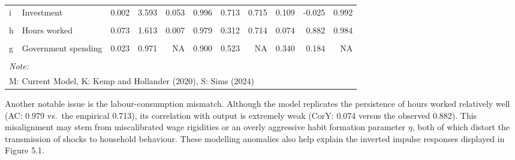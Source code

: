 \documentclass[11pt,preprint]{elsarticle}
\let\origtable\table
\let\endorigtable\endtable
\renewenvironment{table}[1][2] {
    \expandafter\origtable\expandafter[H]
} {
    \endorigtable
}
\numberwithin{equation}{section}
\numberwithin{figure}{section}
\numberwithin{table}{section}
\begin{document}
\begin{table}[!h]
{\begin{tabular}[t]{llrrrrrrrrr}
\addlinespace
i & Investment & 0.002 & 3.593 & 0.053 & 0.996 & 0.713 & 0.715 & 0.109 & -0.025 & 0.992\\
\cellcolor{gray!10}{w} & \cellcolor{gray!10}{Real wage} & \cellcolor{gray!10}{0.147} & \cellcolor{gray!10}{1.802} & \cellcolor{gray!10}{0.010} & \cellcolor{gray!10}{0.979} & \cellcolor{gray!10}{0.186} & \cellcolor{gray!10}{0.739} & \cellcolor{gray!10}{0.076} & \cellcolor{gray!10}{0.128} & \cellcolor{gray!10}{0.992}\\
h & Hours worked & 0.073 & 1.613 & 0.007 & 0.979 & 0.312 & 0.714 & 0.074 & 0.882 & 0.984\\
\cellcolor{gray!10}{K} & \cellcolor{gray!10}{Capital} & \cellcolor{gray!10}{0.002} & \cellcolor{gray!10}{NA} & \cellcolor{gray!10}{NA} & \cellcolor{gray!10}{1.000} & \cellcolor{gray!10}{NA} & \cellcolor{gray!10}{NA} & \cellcolor{gray!10}{0.068} & \cellcolor{gray!10}{NA} & \cellcolor{gray!10}{NA}\\
g & Government spending & 0.023 & 0.971 & NA & 0.900 & 0.523 & NA & 0.340 & 0.184 & NA\\
\addlinespace
\cellcolor{gray!10}{tau} & \cellcolor{gray!10}{Taxes} & \cellcolor{gray!10}{0.023} & \cellcolor{gray!10}{NA} & \cellcolor{gray!10}{NA} & \cellcolor{gray!10}{0.900} & \cellcolor{gray!10}{NA} & \cellcolor{gray!10}{NA} & \cellcolor{gray!10}{0.000} & \cellcolor{gray!10}{NA} & \cellcolor{gray!10}{NA}\\
\bottomrule
\multicolumn{11}{l}{\rule{0pt}{1em}\textit{Note:}}\\
\multicolumn{11}{l}{\rule{0pt}{1em}M: Current Model, K: Kemp and Hollander (2020), S: Sims (2024)}\\
\end{tabular}}
\end{table}

Another notable issue is the labour-consumption mismatch. Although the
model replicates the persistence of hours worked relatively well (AC:
0.979 vs.~the empirical 0.713), its correlation with output is extremely
weak (CorY: 0.074 versus the observed 0.882). This misalignment may stem
from miscalibrated wage rigidities or an overly aggressive habit
formation parameter \(\eta\), both of which distort the transmission of
shocks to household behaviour. These modelling anomalies also help
explain the inverted impulse responses displayed in Figure 5.1.
\end{document}

